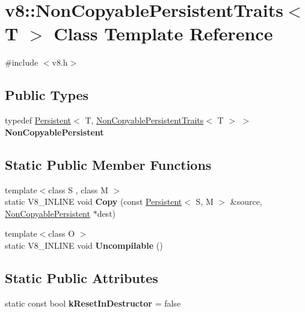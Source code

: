 \hypertarget{classv8_1_1NonCopyablePersistentTraits}{}\section{v8\+:\+:Non\+Copyable\+Persistent\+Traits$<$ T $>$ Class Template Reference}
\label{classv8_1_1NonCopyablePersistentTraits}


{\ttfamily \#include $<$v8.\+h$>$}

\subsection*{Public Types}
\begin{DoxyCompactItemize}
\item 
\mbox{\label{classv8_1_1NonCopyablePersistentTraits_af26082b31726b82c0482a01daa2f3e54}} 
typedef \mbox{\hyperlink{classv8_1_1Persistent}{Persistent}}$<$ T, \mbox{\hyperlink{classv8_1_1NonCopyablePersistentTraits}{Non\+Copyable\+Persistent\+Traits}}$<$ T $>$ $>$ {\bfseries Non\+Copyable\+Persistent}
\end{DoxyCompactItemize}
\subsection*{Static Public Member Functions}
\begin{DoxyCompactItemize}
\item 
\mbox{\label{classv8_1_1NonCopyablePersistentTraits_a40b133b17a334c5c7674135e7dbcf850}} 
{\footnotesize template$<$class S , class M $>$ }\\static V8\+\_\+\+I\+N\+L\+I\+NE void {\bfseries Copy} (const \mbox{\hyperlink{classv8_1_1Persistent}{Persistent}}$<$ S, M $>$ \&source, \mbox{\hyperlink{classv8_1_1Persistent}{Non\+Copyable\+Persistent}} $\ast$dest)
\item 
\mbox{\label{classv8_1_1NonCopyablePersistentTraits_a90e2c6958ba089f5fabbbc7c08f976c1}} 
{\footnotesize template$<$class O $>$ }\\static V8\+\_\+\+I\+N\+L\+I\+NE void {\bfseries Uncompilable} ()
\end{DoxyCompactItemize}
\subsection*{Static Public Attributes}
\begin{DoxyCompactItemize}
\item 
\mbox{\label{classv8_1_1NonCopyablePersistentTraits_a650880d85ff80634c30a195d20329681}} 
static const bool {\bfseries k\+Reset\+In\+Destructor} = false
\end{DoxyCompactItemize}


